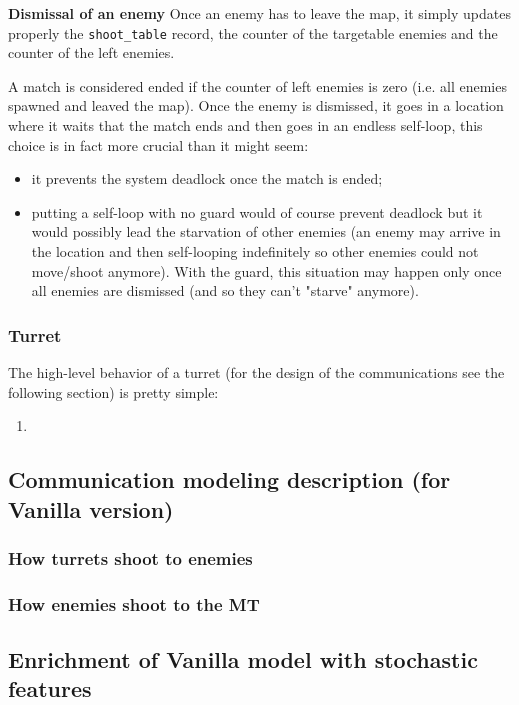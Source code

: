 \documentclass[
10pt, %
a4paper, %
oneside, %
headinclude,footinclude, %
BCOR5mm, %
]{scrartcl}
\begin{document}
				\begin{flushleft}
					\textbf{Dismissal of an enemy}
					Once an enemy has to leave the map, it simply updates properly the \texttt{shoot\_table} record, the counter of the targetable enemies and the counter of the left enemies.
					
					A match is considered ended if the counter of left enemies is zero (i.e. all enemies spawned and leaved the map). Once the enemy is dismissed, it goes in a location where it waits that the match ends and then goes in an endless self-loop, this choice is in fact more crucial than it might seem:
					\begin{itemize}
						\item it prevents the system deadlock once the match is ended;
						\item putting a self-loop with no guard would of course prevent deadlock but it would possibly lead the starvation of other enemies (an enemy may arrive in the location and then self-looping indefinitely so other enemies could not move/shoot anymore). With the guard, this situation may happen only once all enemies are dismissed (and so they can't "starve" anymore).
					\end{itemize}
				\end{flushleft}
			\subsubsection{Turret}
				The high-level behavior of a turret (for the design of the communications see the following section) is pretty simple:
				\begin{enumerate}
					\item 
				\end{enumerate}
		\subsection{Communication modeling description (for Vanilla version)}
			\subsubsection{How turrets shoot to enemies}
			\subsubsection{How enemies shoot to the MT}
		\subsection{Enrichment of Vanilla model with stochastic features}
\end{document}
